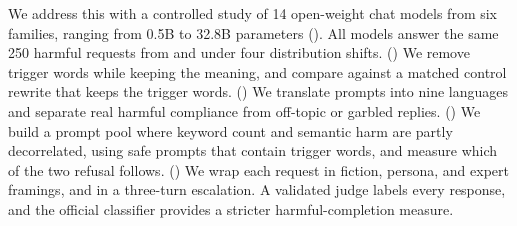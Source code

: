 We address this with a controlled study of 14 open-weight chat models from six families, ranging from 0.5B to 32.8B parameters (). All models answer the same 250 harmful requests from \jbb \cite{chao2024jailbreakbench} and \harmbench \cite{mazeika2024harmbench} under four distribution shifts. (\eone) We remove trigger words while keeping the meaning, and compare against a matched control rewrite that keeps the trigger words. (\etwo) We translate \multijail prompts into nine languages and separate real harmful compliance from off-topic or garbled replies. (\ethree) We build a prompt pool where keyword count and semantic harm are partly decorrelated, using \xstest \cite{rottger2024xstest} safe prompts that contain trigger words, and measure which of the two refusal follows. (\efour) We wrap each request in fiction, persona, and expert framings, and in a three-turn escalation. A validated \judge judge labels every response, and the official \harmbench classifier provides a stricter harmful-completion measure.

